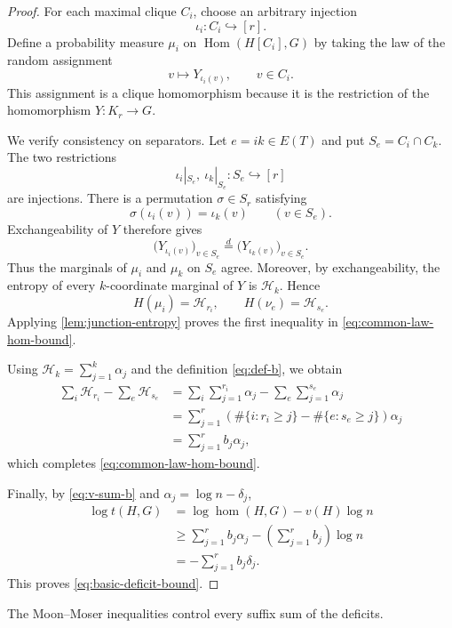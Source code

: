 \documentclass[11pt]{article}
\numberwithin{equation}{section}
\DeclareMathOperator{\Hom}{Hom}
\DeclareMathOperator{\homnum}{hom}
\newcommand{\cH}{\mathcal H}
\begin{document}
\begin{proof}
For each maximal clique $C_i$, choose an arbitrary injection
\[
 \iota_i:C_i\hookrightarrow[r].
\]
Define a probability measure $\mu_i$ on $\Hom(H[C_i],G)$ by taking the
law of the random assignment
\[
 v\longmapsto Y_{\iota_i(v)},
 \qquad v\in C_i.
\]
This assignment is a clique homomorphism because it is the restriction
of the homomorphism $Y:K_r\to G$.

We verify consistency on separators.  Let $e=ik\in E(T)$ and put
$S_e=C_i\cap C_k$.  The two restrictions
\[
 \iota_i|_{S_e},\ \iota_k|_{S_e}:S_e\hookrightarrow[r]
\]
are injections.  There is a permutation $\sigma\in S_r$ satisfying
\[
 \sigma(\iota_i(v))=\iota_k(v)
 \qquad(v\in S_e).
\]
Exchangeability of $Y$ therefore gives
\[
 \bigl(Y_{\iota_i(v)}\bigr)_{v\in S_e}
 \stackrel{d}{=}
 \bigl(Y_{\iota_k(v)}\bigr)_{v\in S_e}.
\]
Thus the marginals of $\mu_i$ and $\mu_k$ on $S_e$ agree.  Moreover, by
exchangeability, the entropy of every $k$-coordinate marginal of $Y$ is
$\cH_k$.  Hence
\[
 H(\mu_i)=\cH_{r_i},
 \qquad
 H(\nu_e)=\cH_{s_e}.
\]
Applying \cref{lem:junction-entropy} proves the first inequality in
\eqref{eq:common-law-hom-bound}.

Using $\cH_k=\sum_{j=1}^k\alpha_j$ and the definition
\eqref{eq:def-b}, we obtain
\[
 \begin{aligned}
 \sum_i\cH_{r_i}-\sum_e\cH_{s_e}
 &=\sum_i\sum_{j=1}^{r_i}\alpha_j
   -\sum_e\sum_{j=1}^{s_e}\alpha_j\\
 &=\sum_{j=1}^r
   \left(\#\{i:r_i\geq j\}-\#\{e:s_e\geq j\}\right)\alpha_j\\
 &=\sum_{j=1}^r b_j\alpha_j,
 \end{aligned}
\]
which completes \eqref{eq:common-law-hom-bound}.

Finally, by \eqref{eq:v-sum-b} and
$\alpha_j=\log n-\delta_j$,
\[
 \begin{aligned}
 \log t(H,G)
 &=\log\homnum(H,G)-v(H)\log n\\
 &\geq\sum_{j=1}^r b_j\alpha_j
       -\left(\sum_{j=1}^r b_j\right)\log n\\
 &=-\sum_{j=1}^r b_j\delta_j.
 \end{aligned}
\]
This proves \eqref{eq:basic-deficit-bound}.
\end{proof}

The Moon--Moser inequalities control every suffix sum of the deficits.
\end{document}
